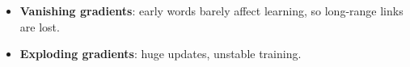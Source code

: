 \documentclass[10pt]{beamer}
\begin{document}
\begin{frame}[fragile]
\begin{itemize}
\item \textbf{Vanishing gradients}: early words barely affect learning,
  so long-range links are lost.
\item \textbf{Exploding gradients}: huge updates, unstable training.
\end{itemize}


\end{frame}
\end{document}
